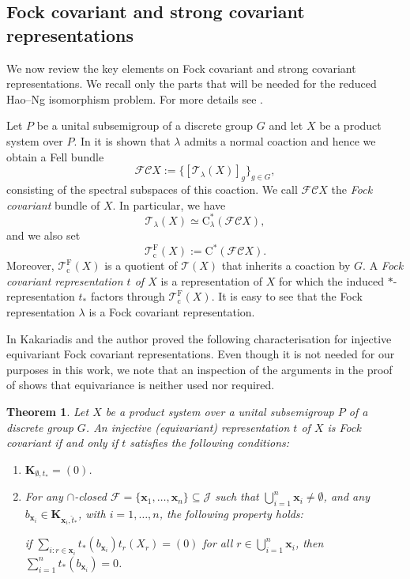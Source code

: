 \documentclass[11pt,final]{amsart}
\numberwithin{equation}{section}
\theoremstyle{plain}
\newtheorem{theorem}{Theorem}[section]
\theoremstyle{definition}
\theoremstyle{remark}
\newcommand{\C}{{\mathcal{C}}}
\newcommand{\F}{{\mathcal{F}}}
\newcommand{\J}{{\mathcal{J}}}
\newcommand{\T}{{\mathcal{T}}}
\def\la{\lambda}
\newcommand{\ca}{\mathrm{C}^*}
\newcommand{\wh}{\widehat}
\newcommand{\cov}{\operatorname{c}}
\newcommand{\fock}{\operatorname{F}}
\newcommand{\mt}{\emptyset}
\newcommand{\bo}[1]{\mathbf{#1}} %
\begin{document}
\subsection{Fock covariant and strong covariant representations}
We now review the key elements on Fock covariant and strong covariant representations. We recall only the parts that will be needed for the reduced Hao--Ng isomorphism problem.
For more details see \cite{DKKLL22, KP25, Seh19, Seh22}.

Let $P$ be a unital subsemigroup of a discrete group $G$ and let $X$ be a product system over $P$. In \cite[Proposition~4.1]{DKKLL22} it is shown that $\la$ admits a normal coaction and hence we obtain a Fell bundle
\[
\F\C X := \Big\{ [\T_\la(X)]_g \Big\}_{g \in G},
\]
consisting of the spectral subspaces of this coaction.
We call $\F\C X$ the \emph{Fock covariant} bundle of $X$. In particular, we have 
\[
\T_\la(X) \simeq \ca_\la(\F\C X),
\]
and we also set 
\[
\T_{\cov}^{\fock}(X):=\ca(\F\C X).
\]
Moreover, $\T_{\cov}^{\fock}(X)$ is a quotient of $\T(X)$ that inherits a coaction by $G$.
A \emph{Fock covariant representation $t$ of $X$} is a representation of $X$ for which the induced $*$-representation $t_\ast$ factors through $\T_{\cov}^{\fock}(X)$. It is easy to see that the Fock representation $\la$ is a Fock covariant representation.

In \cite[Theorem~3.2]{KP25} Kakariadis and the author proved the following characterisation for injective equivariant Fock covariant representations. Even though it is not needed for our purposes in this work, we note that an inspection of the arguments in the proof of \cite[Theorem~3.2]{KP25} shows that equivariance is neither used nor required.

\begin{theorem}\cite[Theorem~3.2]{KP25}\label{T:Fockcov}
Let $X$ be a product system over a unital subsemigroup $P$ of a discrete group $G$. An injective (equivariant) representation $t$ of $X$ is Fock covariant if and only if $t$ satisfies the following conditions:
\begin{enumerate}
\item $\bo{K}_{\mt, t_\ast} = (0)$.
\item For any $\cap$-closed $\F=\{\bo{x}_1,\dots,\bo{x}_n\} \subseteq \J$ such that $\bigcup_{i=1}^n \bo{x}_i \neq \mt$, and any $b_{\bo{x}_i}\in \bo{K}_{\bo{x}_i,\wh{t}_\ast}$, with $i=1,\dots,n$, the following property holds:
\begin{center}
if $\sum\limits_{i: r\in \bo{x}_i}t_\ast(b_{\bo{x}_i})t_r(X_r)=(0)$ for all $r\in \bigcup_{i=1}^n \bo{x}_i$, then $\sum\limits_{i=1} ^n t_\ast(b_{\bo{x}_i})=0$.    
\end{center}
\end{enumerate}
\end{theorem}
\end{document}
